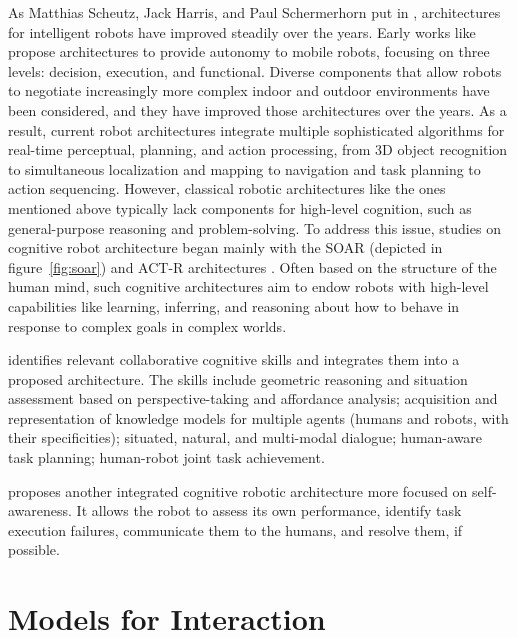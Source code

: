 As Matthias Scheutz, Jack Harris, and Paul Schermerhorn put in \cite{scheutz_systematic_2013}, architectures for intelligent robots have improved steadily over the years. 
Early works like \cite{alami_designing_1993,alami_architecture_1998,chatila_integrated_1992} propose architectures to provide autonomy to mobile robots, focusing on three levels: decision, execution, and functional. Diverse components that allow robots to negotiate increasingly more complex indoor and outdoor environments have been considered, and they have improved those architectures over the years. As a result, current robot architectures integrate multiple sophisticated algorithms for real-time perceptual, planning, and action processing, from 3D object recognition to simultaneous localization and mapping to navigation and task planning to action sequencing. However, classical robotic architectures like the ones mentioned above typically lack components for high-level cognition, such as general-purpose reasoning and problem-solving. 
To address this issue, studies on cognitive robot architecture began mainly with the SOAR (depicted in figure~\ref{fig:soar}) and ACT-R architectures \cite{laird_soar_1987,anderson2004integrated}.
Often based on the structure of the human mind, such cognitive architectures aim to endow robots with high-level capabilities like learning, inferring, and reasoning about how to behave in response to complex goals in complex worlds. 

\cite{lemaignan_artificial_2017} identifies relevant collaborative cognitive skills and integrates them into a proposed architecture. The skills include geometric reasoning and situation assessment based on perspective-taking and affordance analysis; acquisition and representation of knowledge models for multiple agents (humans and robots, with their specificities); situated, natural, and multi-modal dialogue; human-aware task planning; human-robot joint task achievement.

\cite{thierauf_toward_2024} proposes another integrated cognitive robotic architecture more focused on self-awareness. It allows the robot to assess its own performance, identify task execution failures, communicate them to the humans, and resolve them, if possible. 



\section{Models for Interaction}


